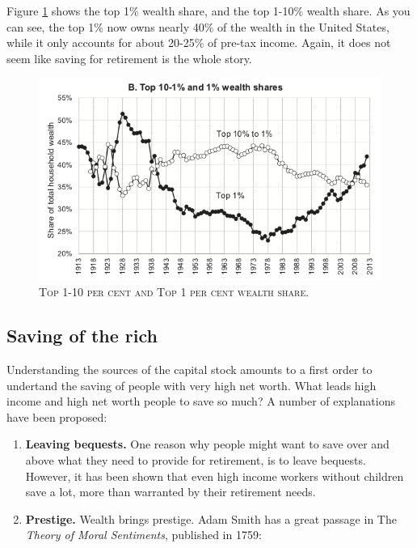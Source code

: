 \documentclass[]{book}
\theoremstyle{definition}
\theoremstyle{definition}
\theoremstyle{definition}
\theoremstyle{remark}
\begin{document}
Figure \ref{fig:saez-zucman-fig6b} shows the top 1\% wealth share, and
the top 1-10\% wealth share. As you can see, the top 1\% now owns nearly
40\% of the wealth in the United States, while it only accounts for
about 20-25\% of pre-tax income. Again, it does not seem like saving for
retirement is the whole story.




\begin{figure}

{\centering \includegraphics[width=1\linewidth,height=1\textheight]{figures/fig6b} 

}

\caption{\textsc{Top 1-10 per cent and Top 1 per cent
wealth share}.}\label{fig:saez-zucman-fig6b}
\end{figure}

\subsection{Saving of the rich}\label{saving-of-the-rich}

Understanding the sources of the capital stock amounts to a first order
to undertand the saving of people with very high net worth. What leads
high income and high net worth people to save so much? A number of
explanations have been proposed:

\begin{enumerate}
\def\labelenumi{\arabic{enumi}.}
\item
  \textbf{Leaving bequests.} One reason why people might want to save
  over and above what they need to provide for retirement, is to leave
  bequests. However, it has been shown that even high income workers
  without children save a lot, more than warranted by their retirement
  needs.
\item
  \textbf{Prestige.} Wealth brings prestige. Adam Smith has a great
  passage in The \emph{Theory of Moral Sentiments}, published in 1759:
\end{enumerate}
\end{document}

